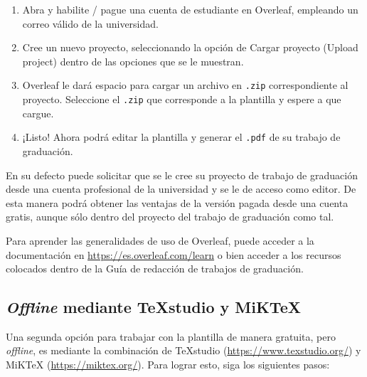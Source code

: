 \begin{enumerate}
    \itemsep 0em

    \item Abra y habilite / pague una cuenta de estudiante en Overleaf, empleando un correo válido de la universidad.

    \item Cree un nuevo proyecto, seleccionando la opción de Cargar proyecto (Upload project) dentro de las opciones que se le muestran.

    \item Overleaf le dará espacio para cargar un archivo en \texttt{.zip} correspondiente al proyecto. Seleccione el \texttt{.zip} que corresponde a la plantilla y espere a que cargue.

    \item ¡Listo! Ahora podrá editar la plantilla y generar el \texttt{.pdf} de su trabajo de graduación.
    
\end{enumerate}



En su defecto puede solicitar que se le cree su proyecto de trabajo de graduación desde una cuenta profesional de la universidad y se le de acceso como editor. De esta manera podrá obtener las ventajas de la versión pagada desde una cuenta gratis, aunque sólo dentro del proyecto del trabajo de graduación como tal.

Para aprender las generalidades de uso de Overleaf, puede acceder a la documentación en \href{https://es.overleaf.com/learn}{https://es.overleaf.com/learn} o bien acceder a los recursos colocados dentro de la Guía de redacción de trabajos de graduación.

\subsection{\textit{Offline} mediante TeXstudio y MiKTeX}

Una segunda opción para trabajar con la plantilla de manera gratuita, pero \textit{offline}, es mediante la combinación de TeXstudio (\href{https://www.texstudio.org/}{https://www.texstudio.org/}) y MiKTeX (\href{https://miktex.org/}{https://miktex.org/}). Para lograr esto, siga los siguientes pasos:

